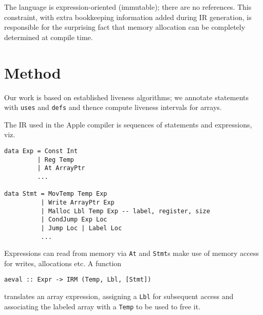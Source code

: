 \documentclass[sigplan,screen]{acmart}
\begin{document}

The language is expression-oriented (immutable); there are no references. This constraint, with extra bookkeeping information added during IR generation, is responsible for the surprising fact that memory allocation can be completely determined at compile time.


\section{Method}

Our work is based on established liveness algorithms; we annotate statements with {\tt uses} and {\tt defs} and thence compute liveness intervals for arrays.




The IR used in the Apple compiler is sequences of statements and expressions, viz.

\begin{verbatim}
data Exp = Const Int
         | Reg Temp
         | At ArrayPtr
         ...

data Stmt = MovTemp Temp Exp
          | Write ArrayPtr Exp
          | Malloc Lbl Temp Exp -- label, register, size
          | CondJump Exp Loc
          | Jump Loc | Label Loc
          ...
\end{verbatim}

Expressions can read from memory via {\tt At} and {\tt Stmt}s make use of memory access for writes, allocations etc. A function

\begin{verbatim}
aeval :: Expr -> IRM (Temp, Lbl, [Stmt])
\end{verbatim}
translates an array expression, assigning a {\tt Lbl} for subsequent access and associating the labeled array with a {\tt Temp} to be used to free it.
\end{document}
